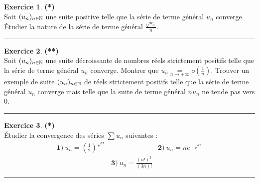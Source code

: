 \documentclass[a4paper,11pt]{article}
\theoremstyle{definition}
\newtheorem{exo}{Exercice} %
\newcommand{\disp}{\displaystyle}
\begin{document}
\begin{minipage}{1\linewidth}
\begin{minipage}[t]{0.48\linewidth}
\end{minipage}\hfill\vrule\hfill\begin{minipage}[t]{0.48\linewidth}\raggedright

\begin{exo}\textbf{(*)}\quad\\[0.2cm]
Soit $(u_n)_{n\in\mathbb{N}}$ une suite positive telle que la série de terme général $u_n$ converge. Étudier la nature de la série de terme général $\frac{\sqrt{u_n}}{n}$.

\centering\rule{1\linewidth}{0.6pt}\end{exo}


\begin{exo}\textbf{(**)}\quad\\[0.2cm]
Soit $(u_n)_{n\in\mathbb{N}}$ une suite décroissante de nombres réels strictement positifs telle que la série de terme général $u_n$ converge. Montrer que $\disp u_n\underset{n\rightarrow+\infty}{=}o\left(\frac{1}{n}\right)$. Trouver un exemple de suite $(u_n)_{n\in\mathbb{N}}$ de réels strictement positifs telle que la série de terme général $u_n$ converge mais telle que la suite de terme général $nu_n$ ne tende pas vers $0$.

\centering\rule{1\linewidth}{0.6pt}\end{exo}

	\begin{exo}\textbf{(*)}\quad\\[0.2cm]
	\'Etudier la convergence des séries $\disp\sum u_n$ suivantes :
	$$\begin{array}{rcl}
	\displaystyle \mathbf 1)\ u_n=\left(\frac{1}{2}\right)^{\sqrt{n}}&&\displaystyle \mathbf 2) \ u_n=ne^{-\sqrt n}\\[0.5cm]
	&\displaystyle \mathbf 3)\ u_n=\frac{(n!)^3}{(3n)!}&
	\end{array}$$
	
	\centering\rule{1\linewidth}{0.6pt}\end{exo}

\end{minipage}\end{minipage} \newpage
\end{document}
